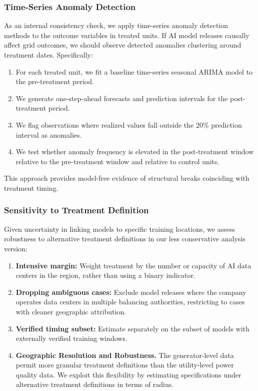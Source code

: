 \documentclass[sigconf]{acmart}
\begin{document}
\subsubsection{Time-Series Anomaly Detection}

As an internal consistency check, we apply time-series anomaly detection methods to the outcome variables in treated units. If AI model releases causally affect grid outcomes, we should observe detected anomalies clustering around treatment dates. Specifically:
\begin{enumerate}
    \item For each treated unit, we fit a baseline time-series seasonal ARIMA model to the pre-treatment period.
    \item We generate one-step-ahead forecasts and prediction intervals for the post-treatment period.
    \item We flag observations where realized values fall outside the 20\% prediction interval as anomalies.
    \item We test whether anomaly frequency is elevated in the post-treatment window relative to the pre-treatment window and relative to control units.
\end{enumerate}
This approach provides model-free evidence of structural breaks coinciding with treatment timing.

\subsubsection{Sensitivity to Treatment Definition}

Given uncertainty in linking models to specific training locations, we assess robustness to alternative treatment definitions in our less conservative analysis version:
\begin{enumerate}
    \item \textbf{Intensive margin:} Weight treatment by the number or capacity of AI data centers in the region, rather than using a binary indicator.
    \item \textbf{Dropping ambiguous cases:} Exclude model releases where the company operates data centers in multiple balancing authorities, restricting to cases with cleaner geographic attribution.
    \item \textbf{Verified timing subset:} Estimate separately on the subset of models with externally verified training windows.
    \item \textbf{Geographic Resolution and Robustness.} The generator-level data permit more granular treatment definitions than the utility-level power quality data. We exploit this flexibility by estimating specifications under alternative treatment definitions in terms of radius.
\end{enumerate}
\end{document}

